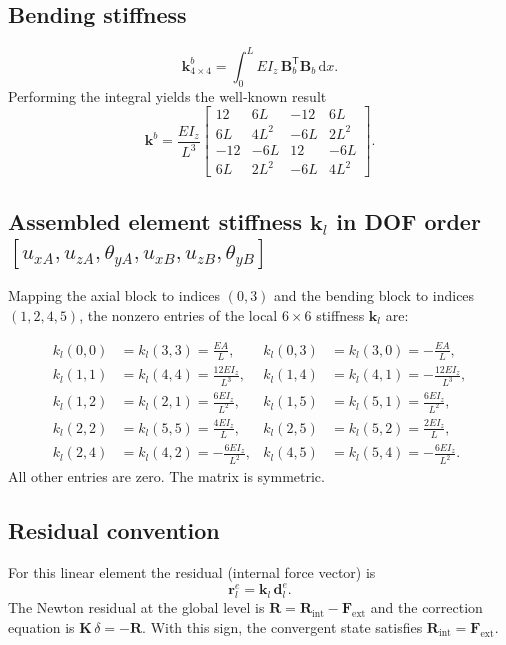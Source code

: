 \documentclass[11pt,a4paper]{article}
\newcommand{\dd}{\mathrm{d}}
\newcommand{\bmath}[1]{\boldsymbol{#1}}
\begin{document}
\subsection{Bending stiffness}

\[
\bmath{k}^b_{4\times 4} = \int_0^L EI_z \,\bmath{B}_b^\mathsf{T}\bmath{B}_b\,\dd x.
\]
Performing the integral yields the well-known result
\[
\bmath{k}^b = \frac{EI_z}{L^3}
\begin{bmatrix}
12 & 6L & -12 & 6L \\
6L & 4L^2 & -6L & 2L^2 \\
-12 & -6L & 12 & -6L \\
6L & 2L^2 & -6L & 4L^2
\end{bmatrix}.
\]

\subsection{Assembled element stiffness \texorpdfstring{$\bmath{k}_l$}{k\_l} in DOF order \texorpdfstring{$[u_{xA},u_{zA},\theta_{yA},u_{xB},u_{zB},\theta_{yB}]$}{[u\_xA, u\_zA, theta\_yA, u\_xB, u\_zB, theta\_yB]}}

Mapping the axial block to indices $(0, 3)$ and the bending block to indices $(1, 2, 4, 5)$, the nonzero entries of the local $6\times 6$ stiffness $\bmath{k}_l$ are:

\begin{align*}
k_l(0,0) &= k_l(3,3) = \tfrac{EA}{L}, & k_l(0,3) &= k_l(3,0) = -\tfrac{EA}{L}, \\[2pt]
k_l(1,1) &= k_l(4,4) = \tfrac{12 E I_z}{L^3}, & k_l(1,4) &= k_l(4,1) = -\tfrac{12 E I_z}{L^3}, \\[2pt]
k_l(1,2) &= k_l(2,1) = \tfrac{6 E I_z}{L^2}, & k_l(1,5) &= k_l(5,1) = \tfrac{6 E I_z}{L^2}, \\[2pt]
k_l(2,2) &= k_l(5,5) = \tfrac{4 E I_z}{L}, & k_l(2,5) &= k_l(5,2) = \tfrac{2 E I_z}{L}, \\[2pt]
k_l(2,4) &= k_l(4,2) = -\tfrac{6 E I_z}{L^2}, & k_l(4,5) &= k_l(5,4) = -\tfrac{6 E I_z}{L^2}.
\end{align*}
All other entries are zero. The matrix is symmetric.

\subsection{Residual convention}

For this linear element the residual (internal force vector) is
\[
\boxed{\,\bmath{r}^e_l = \bmath{k}_l\,\bmath{d}^e_l.\,}
\]
The Newton residual at the global level is $\bmath{R} = \bmath{R}_{\mathrm{int}} - \bmath{F}_{\mathrm{ext}}$ and the correction equation is $\bmath{K}\,\delta = -\bmath{R}$. With this sign, the convergent state satisfies $\bmath{R}_{\mathrm{int}} = \bmath{F}_{\mathrm{ext}}$.
\end{document}
